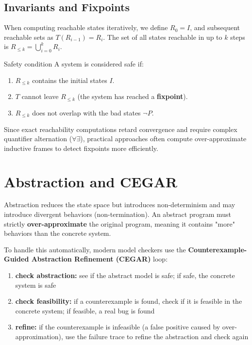 \documentclass[a4paper, 11pt]{report}
\begin{document}
\subsection{Invariants and Fixpoints}
When computing reachable states iteratively, we define $R_0 = I$, and subsequent reachable sets as $T(R_{i-1}) = R_i$. The set of all states reachable in up to $k$ steps is $R_{\le k} = \bigcup_{i=0}^k R_i$.

\begin{defframe}{Safety condition}{}
A system is considered safe if:
\begin{enumerate}
    \item $R_{\le k}$ contains the initial states $I$.
    \item $T$ cannot leave $R_{\le k}$ (the system has reached a \textbf{fixpoint}).
    \item $R_{\le k}$ does not overlap with the bad states $\neg P$.
\end{enumerate}
\end{defframe}

Since exact reachability computations retard convergence and require complex quantifier alternation ($\forall\exists$), practical approaches often compute over-approximate inductive frames to detect fixpoints more efficiently.

\section{Abstraction and CEGAR}
Abstraction reduces the state space but introduces non-determinism and may introduce divergent behaviors (non-termination). An abstract program must strictly \textbf{over-approximate} the original program, meaning it contains "more" behaviors than the concrete system.

To handle this automatically, modern model checkers use the \textbf{Counterexample-Guided Abstraction Refinement (CEGAR)} loop:
\begin{enumerate}
    \item \textbf{check abstraction:} see if the abstract model is safe; if safe, the concrete system is safe
    \item \textbf{check feasibility:} if a counterexample is found, check if it is feasible in the concrete system; if feasible, a real bug is found
    \item \textbf{refine:} if the counterexample is infeasible (a false positive caused by over-approximation), use the failure trace to refine the abstraction and check again
\end{enumerate}
\end{document}
